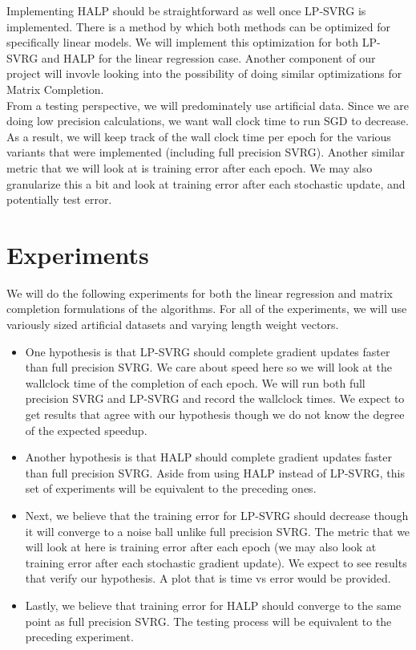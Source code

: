 \documentclass{article}
\begin{document}
\noindent Implementing HALP should be straightforward as well once LP-SVRG is implemented. There is a method by which both methods can be optimized for specifically linear models\cite{halp}. We will implement this optimization for both LP-SVRG and HALP for the linear regression case. Another component of our project will invovle looking into the possibility of doing similar optimizations for Matrix Completion. \\

\noindent From a testing perspective, we will predominately use artificial data. Since we are doing low precision calculations, we want wall clock time to run SGD to decrease. As a result, we will keep track of the wall clock time per epoch for the various variants that were implemented (including full precision SVRG). Another similar metric that we will look at is training error after each epoch. We may also granularize this a bit and look at training error after each stochastic update, and potentially test error.

\newpage
\section{Experiments}
We will do the following experiments for both the linear regression and matrix completion formulations of the algorithms. For all of the experiments, we will use variously sized artificial datasets and varying length weight vectors. 
\begin{itemize}
    \item One hypothesis is that LP-SVRG should complete gradient updates faster than full precision SVRG. We care about speed here so we will look at the wallclock time of the completion of each epoch. We will run both full precision SVRG and LP-SVRG and record the wallclock times. We expect to get results that agree with our hypothesis though we do not know the degree of the expected speedup. 
    \item Another hypothesis is that HALP should complete gradient updates faster than full precision SVRG. Aside from using HALP instead of LP-SVRG, this set of experiments will be equivalent to the preceding ones.
    \item Next, we believe that the training error for LP-SVRG should decrease though it will converge to a noise ball unlike full precision SVRG. The metric that we will look at here is training error after each epoch (we may also look at training error after each stochastic gradient update).  We expect to see results that verify our hypothesis. A plot that is time vs error would be provided. 
    \item Lastly, we believe that training error for HALP should converge to the same point as full precision SVRG. The testing process will be equivalent to the preceding experiment. 
\end{itemize}

\newpage
\printbibliography
\end{document}

